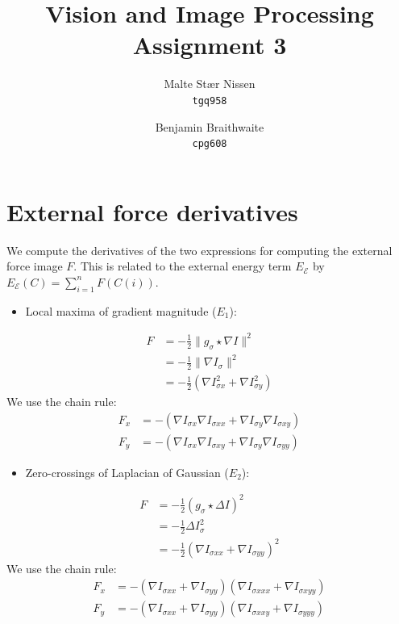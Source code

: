 \documentclass[11pt,a4paper]{article}
\title{Vision and Image Processing\\Assignment 3}
\author{Malte Stær Nissen \\ \texttt{tgq958} \and Benjamin Braithwaite \\
\texttt{cpg608}}
\begin{document}
\maketitle
\section{External force derivatives}
%
We compute the derivatives of the two expressions for computing the external force image $F$. This is related to the external energy term $E_\mathcal{E}$ by $E_\mathcal{E}(C) = \sum_{i=1}^n F(C(i))$.
\begin{itemize}
\item Local maxima of gradient magnitude ($E_1$):
\end{itemize}
%
\begin{align}
F &= - \frac12 \| g_\sigma \star \nabla I \|^2 \\
&= - \frac12 \| \nabla I_{\sigma} \|^2 \\
&= - \frac12 (\nabla I_{\sigma x}^2 + \nabla I_{\sigma y}^2)
\end{align}
%
We use the chain rule:
%
\begin{align}
F_x &= - (\nabla I_{\sigma x} \nabla I_{\sigma xx} + \nabla I_{\sigma y} \nabla I_{\sigma xy}) \\
F_y &= - (\nabla I_{\sigma x} \nabla I_{\sigma xy} + \nabla I_{\sigma y} \nabla I_{\sigma yy})
\end{align}
%
\begin{itemize}
\item Zero-crossings of Laplacian of Gaussian ($E_2$):
\end{itemize}
%
\begin{align}
F &= - \frac12 ( g_\sigma \star \Delta I)^2 \\
&= - \frac12 \Delta I_{\sigma}^2 \\
&= - \frac12 (\nabla I_{\sigma xx} + \nabla I_{\sigma yy})^2
\end{align}
%
We use the chain rule:
%
\begin{align}
F_x &= - (\nabla I_{\sigma xx} + \nabla I_{\sigma yy}) (\nabla I_{\sigma xxx} + \nabla I_{\sigma xyy}) \\
F_y &= - (\nabla I_{\sigma xx} + \nabla I_{\sigma yy}) (\nabla I_{\sigma xxy} + \nabla I_{\sigma yyy})
\end{align}
%
\end{document}
